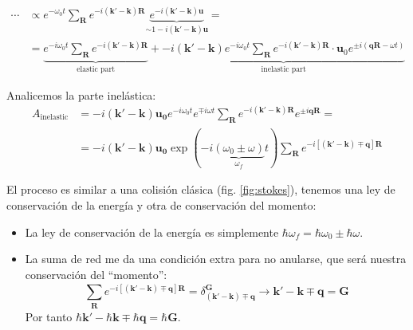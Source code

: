 \begin{equation}
\begin{split}
  \cdots &\propto e^{-\omega_0 t}\sum_{\mathbf{R}}^{} e^{-i (\mathbf{k'} -
    \mathbf{k}) \mathbf{R}}  \underbrace{e^{-i(\mathbf{k'} - \mathbf{k}) \mathbf{u}}
}_{\sim 1 - i(\mathbf{k'} - \mathbf{k} ) \mathbf{u}} = \\
&= \underbrace{e^{-i\omega_0 t}\sum_{\mathbf{R}}^{ }e^{-i(\mathbf{k'}-
  \mathbf{k}) \mathbf{R}}}_{\text{elastic part}} + \underbrace{-i(\mathbf{k'}-
  \mathbf{k}) e^{-i\omega_0 t} \sum_{\mathbf{R}}^{ } e^{-i
  (\mathbf{k'} - \mathbf{k}) \mathbf{R}} \cdot \mathbf{u}_0 e^{\pm i
  (\mathbf{q} \mathbf{R} - \omega t)}}_{\text{inelastic part}}
\end{split}
\end{equation}

Analicemos la parte inelástica:
\begin{equation}
\begin{split}
  A_\text{inelastic} &= -i(\mathbf{k'} - \mathbf{k}) \mathbf{u_0}
  e^{-i\omega_0 t} e^{\mp i \omega t } \sum_{\mathbf{R}}^{ } e^{-i
    (\mathbf{k'} - \mathbf{k})\mathbf{R}} e^{\pm i
                       \mathbf{q}\mathbf{R}} = \\
                     &= -i(\mathbf{k'} - \mathbf{k}) \mathbf{u_0}
  \exp( {-i \underbrace{(\omega_0 \pm \omega)}_{\omega_f}t} )  \sum_{\mathbf{R}}^{ } e^{-i
    [(\mathbf{k'} - \mathbf{k}) \mp \mathbf{q}]\mathbf{R}}
\end{split}
\end{equation}

El proceso es similar a una colisión clásica (fig. \ref{fig:stokes}), tenemos una ley de
conservación de la energía y otra de conservación del momento:
\begin{itemize}
\item La ley de conservación de la energía es simplemente $\hbar
  \omega_f = \hbar \omega_0 \pm \hbar \omega$.
\item La suma de red me da una condición extra para no anularse, que
  será nuestra conservación del ``momento'':
  \begin{equation}
    \sum_{\mathbf{R}}^{ } e^{-i [(\mathbf{k'} - \mathbf{k}) \mp
      \mathbf{q}]\mathbf{R}} = \delta_{(\mathbf{k'}- \mathbf{k}) \mp
      \mathbf{q}}^\mathbf{G} \rightarrow \mathbf{k'} - \mathbf{k} \mp
    \mathbf{q} = \mathbf{G}
  \end{equation}
  Por tanto $\hbar \mathbf{k'} - \hbar \mathbf{k} \mp \hbar \mathbf{q}
  = \hbar \mathbf{G}$.
\end{itemize}

